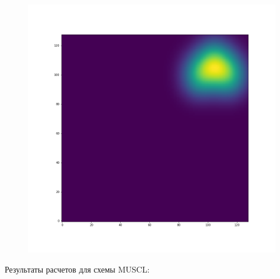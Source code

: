 \documentclass[12pt,a4paper]{article}
\begin{document}
\begin{figure}[H]
\begin{minipage}{.3\textwidth}
\end{minipage}%
\begin{minipage}{.3\textwidth}
  \centering
  \includegraphics[width=\linewidth]{Pictures/Solve2DWhiteBearMovementTestGodunov/Solve2DWhiteBearMovementTest_t50.png}
\end{minipage}
\end{figure}

Результаты расчетов для схемы MUSCL:
\end{document}
